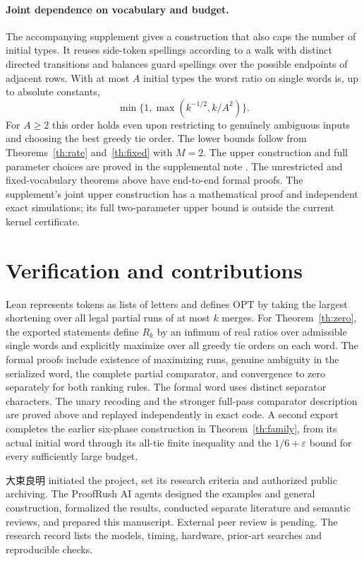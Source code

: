 \documentclass[11pt]{article}
\newcommand{\OPT}{\mathrm{OPT}}
\begin{document}
\paragraph{Joint dependence on vocabulary and budget.}
The accompanying supplement gives a construction that also caps the number of initial types. It reuses side-token spellings according to a walk with distinct directed transitions and balances guard spellings over the possible endpoints of adjacent rows. With at most $A$ initial types the worst ratio on single words is, up to absolute constants,
\[
 \min\{1,\max(k^{-1/2},k/A^2)\}.
\]
For $A\ge2$ this order holds even upon restricting to genuinely ambiguous inputs and choosing the best greedy tie order. The lower bounds follow from Theorems~\ref{th:rate} and~\ref{th:fixed} with $M=2$. The upper construction and full parameter choices are proved in the supplemental note \cite{jointvocab}. The unrestricted and fixed-vocabulary theorems above have end-to-end formal proofs. The supplement's joint upper construction has a mathematical proof and independent exact simulations; its full two-parameter upper bound is outside the current kernel certificate.

\section{Verification and contributions}
Lean represents tokens as lists of letters and defines $\OPT$ by taking the largest shortening over all legal partial runs of at most $k$ merges. For Theorem~\ref{th:zero}, the exported statements define $R_k$ by an infimum of real ratios over admissible single words and explicitly maximize over all greedy tie orders on each word. The formal proofs include existence of maximizing runs, genuine ambiguity in the serialized word, the complete partial comparator, and convergence to zero separately for both ranking rules. The formal word uses distinct separator characters. The unary recoding and the stronger full-pass comparator description are proved above and replayed independently in exact code. A second export completes the earlier six-phase construction in Theorem~\ref{th:family}, from its actual initial word through its all-tie finite inequality and the $1/6+\varepsilon$ bound for every sufficiently large budget.

{\namefont 大束良明} initiated the project, set its research criteria and authorized public archiving. The ProofRush AI agents designed the examples and general construction, formalized the results, conducted separate literature and semantic reviews, and prepared this manuscript. External peer review is pending. The research record lists the models, timing, hardware, prior-art searches and reproducible checks.
\end{document}
